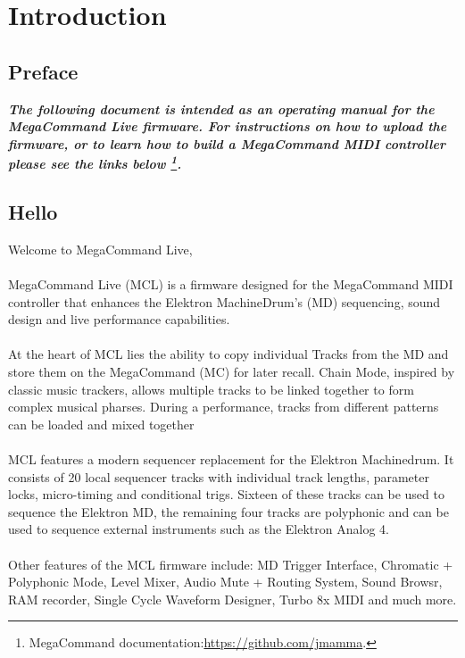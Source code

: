 \chapter{Introduction}

\section{Preface}

\begin{small}
\textbf{\textit{The following document is intended as an operating manual for the MegaCommand Live firmware. For instructions on how to upload the firmware, or to learn how to build a MegaCommand MIDI controller please see the links below \footnote{MegaCommand documentation:\url{https://github.com/jmamma}.}.}}
\end{small}

\section{Hello}
Welcome to MegaCommand Live, 
\\
\\
MegaCommand Live (MCL) is a firmware designed for the MegaCommand MIDI controller that enhances the Elektron MachineDrum's (MD) sequencing, sound design and live performance capabilities.
\\
\\
At the heart of MCL lies the ability to copy individual Tracks from the MD and store them on the MegaCommand (MC) for later recall. Chain Mode, inspired by classic music trackers, allows multiple tracks to be linked together to form complex musical pharses. During a performance, tracks from different patterns can be loaded and mixed together
\\
\\
MCL features a modern sequencer replacement for the Elektron Machinedrum. It consists of 20 local sequencer tracks with individual track lengths, parameter locks, micro-timing and conditional trigs. Sixteen of these tracks can be used to sequence the Elektron MD, the remaining four tracks are polyphonic and can be used to sequence external instruments such as the Elektron Analog 4. 
\\
\\
Other features of the MCL firmware include: MD Trigger Interface, Chromatic + Polyphonic Mode,  Level Mixer, Audio Mute + Routing System, Sound Browsr, RAM recorder, Single Cycle Waveform Designer, Turbo 8x MIDI and much more.
